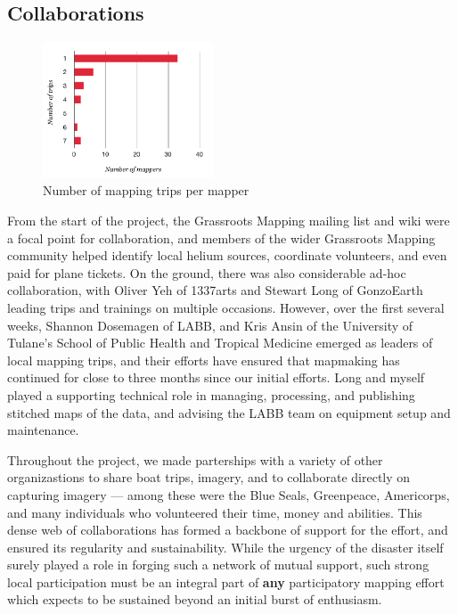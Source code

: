\documentclass[11pt,oneside,notitlepage]{report}
\begin{document}
\subsection{Collaborations}

\begin{figure}
	\label{fig:tripspermapper}
	\begin{flushright}
		\includegraphics[width=0.45\textwidth]{diagrams/mappers-histogram.pdf}
		\caption{Number of mapping trips per mapper}
	\end{flushright}
\end{figure}

From the start of the project, the Grassroots Mapping mailing list and wiki were a focal point for collaboration, and members of the wider Grassroots Mapping community helped identify local helium sources, coordinate volunteers, and even paid for plane tickets. On the ground, there was also considerable ad-hoc collaboration, with Oliver Yeh of 1337arts and Stewart Long of GonzoEarth leading trips and trainings on multiple occasions. However, over the first several weeks, Shannon Dosemagen of \ac{LABB}, and Kris Ansin of the University of Tulane's School of Public Health and Tropical Medicine emerged as leaders of local mapping trips, and their efforts have ensured that mapmaking has continued for close to three months since our initial efforts. Long and myself played a supporting technical role in managing, processing, and publishing stitched maps of the data, and advising the \ac{LABB} team on equipment setup and maintenance. 

Throughout the project, we made parterships with a variety of other organizastions to share boat trips, imagery, and to collaborate directly on capturing imagery --- among these were the Blue Seals, Greenpeace, Americorps, and many individuals who volunteered their time, money and abilities. This dense web of collaborations has formed a backbone of support for the effort, and ensured its regularity and sustainability. While the urgency of the disaster itself surely played a role in forging such a network of mutual support, such strong local participation must be an integral part of \textbf{any} participatory mapping effort which expects to be sustained beyond an initial burst of enthusiasm.
\end{document}
